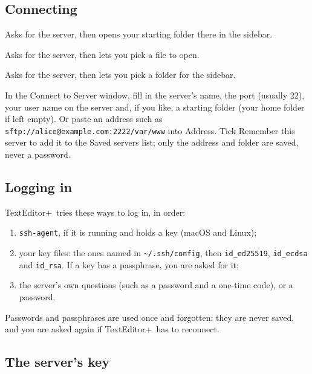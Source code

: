 \documentclass[11pt,a4paper]{article}
\newcommand{\appname}{TextEditor+}
\newcommand{\menu}[1]{\textsf{\textbf{#1}}}
\newcommand{\ui}[1]{\textsf{#1}}
\begin{document}
\subsection{Connecting}

\begin{description}[style=nextline, leftmargin=1.5em]
  \item[\menu{File > Connect to Server…} (\key{⌘K} / \key{Ctrl+K})]
    Asks for the server, then opens your starting folder there in the
    sidebar.
  \item[\menu{File > Open Remote File…}]
    Asks for the server, then lets you pick a file to open.
  \item[\menu{File > Open Remote Folder…}]
    Asks for the server, then lets you pick a folder for the sidebar.
\end{description}

In the \ui{Connect to Server} window, fill in the server's name, the port
(usually 22), your user name on the server and, if you like, a starting folder
(your home folder if left empty). Or paste an address such as
\texttt{sftp://alice@example.com:2222/var/www} into \ui{Address}. Tick
\ui{Remember this server} to add it to the \ui{Saved servers} list; only the
address and folder are saved, never a password.

\subsection{Logging in}

\appname\ tries these ways to log in, in order:

\begin{enumerate}
  \item \texttt{ssh-agent}, if it is running and holds a key (macOS and Linux);
  \item your key files: the ones named in \texttt{\textasciitilde/.ssh/config},
        then \texttt{id\_ed25519}, \texttt{id\_ecdsa} and \texttt{id\_rsa}.
        If a key has a passphrase, you are asked for it;
  \item the server's own questions (such as a password and a one-time code),
        or a password.
\end{enumerate}

Passwords and passphrases are used once and forgotten: they are never saved,
and you are asked again if \appname\ has to reconnect.

\subsection{The server's key}
\end{document}

